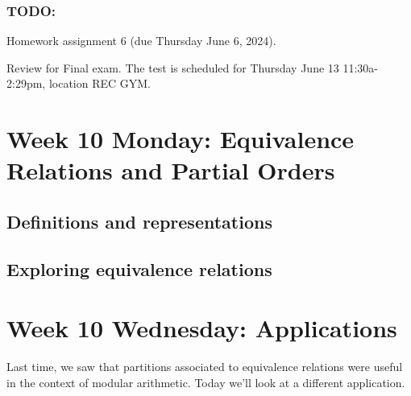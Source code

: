 \subsubsection*{TODO:}
\begin{list}
   {\itemsep2pt}
   \item Homework assignment 6 (due Thursday June 6, 2024).
   \item Review for Final exam. The test is scheduled for Thursday June 13 11:30a-2:29pm, location REC GYM.
\end{list}

\newpage
\section*{Week 10 Monday: Equivalence Relations and Partial Orders}
\subsection*{Definitions and representations}



\vfill

\vfill
\newpage
\subsection*{Exploring equivalence relations}



\vfill

\vfill
\newpage


\vfill

\vfill
\newpage

\vfill
\newpage

\newpage
\section*{Week 10 Wednesday: Applications}



Last time, we saw that partitions associated to equivalence relations
were useful in the context of modular arithmetic.
Today we'll look at a different application.




